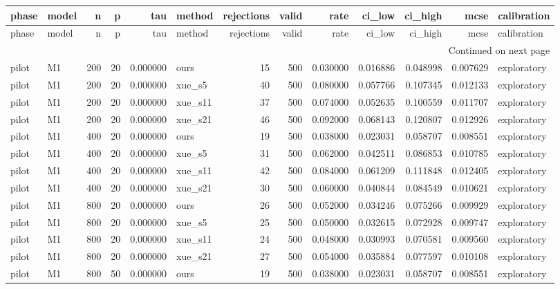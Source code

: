 \begin{longtable}{llrrrlrrrrrrl}
\toprule
phase & model & n & p & tau & method & rejections & valid & rate & ci\_low & ci\_high & mcse & calibration \\
\midrule
\endfirsthead
\toprule
phase & model & n & p & tau & method & rejections & valid & rate & ci\_low & ci\_high & mcse & calibration \\
\midrule
\endhead
\midrule
\multicolumn{13}{r}{Continued on next page} \\
\midrule
\endfoot
\bottomrule
\endlastfoot
pilot & M1 & 200 & 20 & 0.000000 & ours & 15 & 500 & 0.030000 & 0.016886 & 0.048998 & 0.007629 & exploratory \\
pilot & M1 & 200 & 20 & 0.000000 & xue\_s5 & 40 & 500 & 0.080000 & 0.057766 & 0.107345 & 0.012133 & exploratory \\
pilot & M1 & 200 & 20 & 0.000000 & xue\_s11 & 37 & 500 & 0.074000 & 0.052635 & 0.100559 & 0.011707 & exploratory \\
pilot & M1 & 200 & 20 & 0.000000 & xue\_s21 & 46 & 500 & 0.092000 & 0.068143 & 0.120807 & 0.012926 & exploratory \\
pilot & M1 & 400 & 20 & 0.000000 & ours & 19 & 500 & 0.038000 & 0.023031 & 0.058707 & 0.008551 & exploratory \\
pilot & M1 & 400 & 20 & 0.000000 & xue\_s5 & 31 & 500 & 0.062000 & 0.042511 & 0.086853 & 0.010785 & exploratory \\
pilot & M1 & 400 & 20 & 0.000000 & xue\_s11 & 42 & 500 & 0.084000 & 0.061209 & 0.111848 & 0.012405 & exploratory \\
pilot & M1 & 400 & 20 & 0.000000 & xue\_s21 & 30 & 500 & 0.060000 & 0.040844 & 0.084549 & 0.010621 & exploratory \\
pilot & M1 & 800 & 20 & 0.000000 & ours & 26 & 500 & 0.052000 & 0.034246 & 0.075266 & 0.009929 & exploratory \\
pilot & M1 & 800 & 20 & 0.000000 & xue\_s5 & 25 & 500 & 0.050000 & 0.032615 & 0.072928 & 0.009747 & exploratory \\
pilot & M1 & 800 & 20 & 0.000000 & xue\_s11 & 24 & 500 & 0.048000 & 0.030993 & 0.070581 & 0.009560 & exploratory \\
pilot & M1 & 800 & 20 & 0.000000 & xue\_s21 & 27 & 500 & 0.054000 & 0.035884 & 0.077597 & 0.010108 & exploratory \\
pilot & M1 & 800 & 50 & 0.000000 & ours & 19 & 500 & 0.038000 & 0.023031 & 0.058707 & 0.008551 & exploratory \\

\end{longtable}

